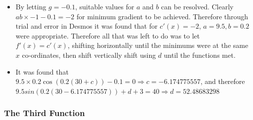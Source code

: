 \documentclass[11pt, letterpaper]{article}
\begin{document}
\begin{itemize}
	\item By letting $g=-0.1$, suitable values for $a$ and $b$ can be resolved. Clearly $ab\times-1-0.1=-2$ for minimum gradient to be achieved. Therefore through trial and error in Desmos it was found that for $c'(x)=-2$, $a=9.5,b=0.2$ were appropriate. Therefore all that was left to do was to let $f'(x)=c'(x)$, shifting horizontally until the minimums were at the same $x$ co-ordinates, then shift vertically shift using $d$ until the functions met.  
	\item It was found  that $9.5\times0.2\cos (0.2(30+c))-0.1=0 \Rightarrow c=-6.174775557$, and therefore $9.5sin(0.2(30-6.174775557))+d+3=40 \Rightarrow d=52.48683298$
\end{itemize}
\subsubsection{The Third Function}
\end{document}
